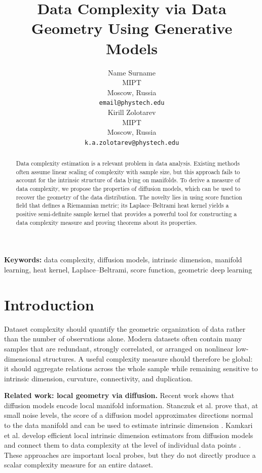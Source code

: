 \documentclass{article}
\title{Data Complexity via Data Geometry Using Generative Models}
\author{
  Name Surname\\
  MIPT\\
  Moscow, Russia\\
  \texttt{email@phystech.edu}\\
  \And
  Kirill Zolotarev\\
  MIPT\\
  Moscow, Russia\\
  \texttt{k.a.zolotarev@phystech.edu}\\
}
\begin{document}
\maketitle 



\begin{abstract}
Data complexity estimation is a relevant problem in data analysis. Existing methods often assume linear scaling of complexity with sample size, but this approach fails to account for the intrinsic structure of data lying on manifolds. To derive a measure of data complexity, we propose  the properties of diffusion models, which can be used to recover the geometry of the data distribution. The novelty lies in using score function field that defines a Riemannian metric; its Laplace–Beltrami heat kernel yields a positive semi-definite
sample kernel that provides a powerful tool for constructing a data complexity measure and proving theorems about its properties.
\end{abstract}

\textbf{Keywords:} data complexity, diffusion models, intrinsic dimension, manifold learning, heat kernel, Laplace--Beltrami, score function, geometric deep learning

\section{Introduction}\label{sec:intro}

Dataset complexity should quantify the geometric organization of data rather than the number of observations alone. Modern datasets often contain many samples that are redundant, strongly correlated, or arranged on nonlinear low-dimensional structures. A useful complexity measure should therefore be global: it should aggregate relations across the whole sample while remaining sensitive to intrinsic dimension, curvature, connectivity, and duplication.

\textbf{Related work: local geometry via diffusion.} Recent work shows that diffusion models encode local manifold information. Stanczuk et al. prove that, at small noise levels, the score of a diffusion model approximates directions normal to the data manifold and can be used to estimate intrinsic dimension \citep{stanczuk2024diffusion}. Kamkari et al. develop efficient local intrinsic dimension estimators from diffusion models and connect them to data complexity at the level of individual data points \citep{kamkari2024geometric}. These approaches are important local probes, but they do not directly produce a scalar complexity measure for an entire dataset.
\end{document}

